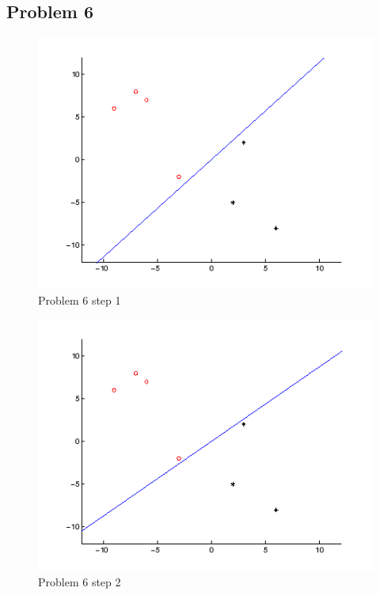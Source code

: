 \subsection*{Problem 6}
\begin{figure}
\centering{}\includegraphics[width=1\textwidth]{plots/6_1}\caption{Problem 6 step 1}
\end{figure}
\begin{figure}
\centering{}\includegraphics[width=1\textwidth]{plots/6_2}\caption{Problem 6 step 2}
\end{figure}
